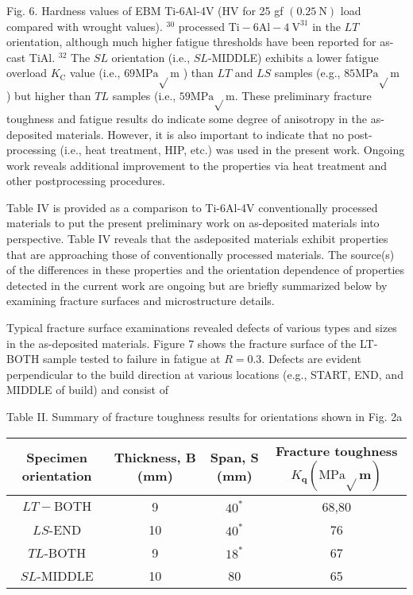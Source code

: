 \documentclass[10pt]{article}
\begin{document}
Fig. 6. Hardness values of EBM Ti-6Al-4V (HV for 25 gf $(0.25 \mathrm{~N})$ load compared with wrought values). ${ }^{30}$ processed $\mathrm{Ti}-6 \mathrm{Al}-4 \mathrm{~V}^{31}$ in the $L T$ orientation, although much higher fatigue thresholds have been reported for as-cast TiAl. ${ }^{32}$ The $S L$ orientation (i.e., $S L$-MIDDLE) exhibits a lower fatigue overload $K_{\mathrm{C}}$ value (i.e., $69 \mathrm{MPa} \sqrt{ } \mathrm{m}$ ) than $L T$ and $L S$ samples (e.g., $85 \mathrm{MPa} \sqrt{ } \mathrm{m}$ ) but higher than $T L$ samples (i.e., $59 \mathrm{MPa} \sqrt{ } \mathrm{m}$. These preliminary fracture toughness and fatigue results do indicate some degree of anisotropy in the as-deposited materials. However, it is also important to indicate that no post-processing (i.e., heat treatment, HIP, etc.) was used in the present work. Ongoing work reveals additional improvement to the properties via heat treatment and other postprocessing procedures.

Table IV is provided as a comparison to Ti-6Al-4V conventionally processed materials to put the present preliminary work on as-deposited materials into perspective. Table IV reveals that the asdeposited materials exhibit properties that are approaching those of conventionally processed materials. The source(s) of the differences in these properties and the orientation dependence of properties detected in the current work are ongoing but are briefly summarized below by examining fracture surfaces and microstructure details.

Typical fracture surface examinations revealed defects of various types and sizes in the as-deposited materials. Figure 7 shows the fracture surface of the LT-BOTH sample tested to failure in fatigue at $R=0.3$. Defects are evident perpendicular to the build direction at various locations (e.g., START, END, and MIDDLE of build) and consist of

Table II. Summary of fracture toughness results for orientations shown in Fig. 2a

\begin{center}
\begin{tabular}{|c|c|c|c|}
\hline
Specimen orientation & Thickness, B (mm) & Span, S (mm) & Fracture toughness $K_{\mathbf{q}}(\mathrm{MPa} \sqrt{ } \mathbf{m})$ \\
\hline
$L T-\mathrm{BOTH}$ & 9 & $40^{*}$ & 68,80 \\
\hline
$L S$-END & 10 & $40^{*}$ & 76 \\
\hline
$T L$-BOTH & 9 & $18^{*}$ & 67 \\
\hline
$S L$-MIDDLE & 10 & 80 & 65 \\
\hline
\end{tabular}
\end{center}
\end{document}
